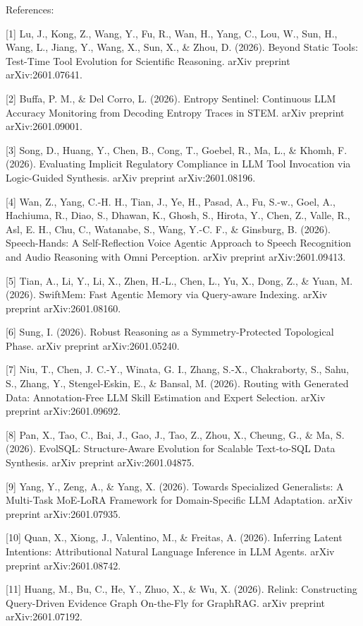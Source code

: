 References:

[1] Lu, J., Kong, Z., Wang, Y., Fu, R., Wan, H., Yang, C., Lou, W., Sun, H., Wang, L., Jiang, Y., Wang, X., Sun, X., & Zhou, D. (2026). Beyond Static Tools: Test-Time Tool Evolution for Scientific Reasoning. arXiv preprint arXiv:2601.07641.

[2] Buffa, P. M., & Del Corro, L. (2026). Entropy Sentinel: Continuous LLM Accuracy Monitoring from Decoding Entropy Traces in STEM. arXiv preprint arXiv:2601.09001.

[3] Song, D., Huang, Y., Chen, B., Cong, T., Goebel, R., Ma, L., & Khomh, F. (2026). Evaluating Implicit Regulatory Compliance in LLM Tool Invocation via Logic-Guided Synthesis. arXiv preprint arXiv:2601.08196.

[4] Wan, Z., Yang, C.-H. H., Tian, J., Ye, H., Pasad, A., Fu, S.-w., Goel, A., Hachiuma, R., Diao, S., Dhawan, K., Ghosh, S., Hirota, Y., Chen, Z., Valle, R., Asl, E. H., Chu, C., Watanabe, S., Wang, Y.-C. F., & Ginsburg, B. (2026). Speech-Hands: A Self-Reflection Voice Agentic Approach to Speech Recognition and Audio Reasoning with Omni Perception. arXiv preprint arXiv:2601.09413.

[5] Tian, A., Li, Y., Li, X., Zhen, H.-L., Chen, L., Yu, X., Dong, Z., & Yuan, M. (2026). SwiftMem: Fast Agentic Memory via Query-aware Indexing. arXiv preprint arXiv:2601.08160.

[6] Sung, I. (2026). Robust Reasoning as a Symmetry-Protected Topological Phase. arXiv preprint arXiv:2601.05240.

[7] Niu, T., Chen, J. C.-Y., Winata, G. I., Zhang, S.-X., Chakraborty, S., Sahu, S., Zhang, Y., Stengel-Eskin, E., & Bansal, M. (2026). Routing with Generated Data: Annotation-Free LLM Skill Estimation and Expert Selection. arXiv preprint arXiv:2601.09692.

[8] Pan, X., Tao, C., Bai, J., Gao, J., Tao, Z., Zhou, X., Cheung, G., & Ma, S. (2026). EvolSQL: Structure-Aware Evolution for Scalable Text-to-SQL Data Synthesis. arXiv preprint arXiv:2601.04875.

[9] Yang, Y., Zeng, A., & Yang, X. (2026). Towards Specialized Generalists: A Multi-Task MoE-LoRA Framework for Domain-Specific LLM Adaptation. arXiv preprint arXiv:2601.07935.

[10] Quan, X., Xiong, J., Valentino, M., & Freitas, A. (2026). Inferring Latent Intentions: Attributional Natural Language Inference in LLM Agents. arXiv preprint arXiv:2601.08742.

[11] Huang, M., Bu, C., He, Y., Zhuo, X., & Wu, X. (2026). Relink: Constructing Query-Driven Evidence Graph On-the-Fly for GraphRAG. arXiv preprint arXiv:2601.07192.


